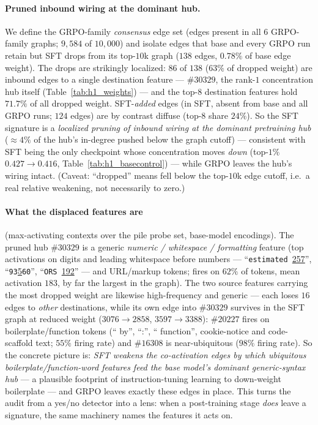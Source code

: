 \documentclass{article}
\begin{document}
\paragraph{Pruned inbound wiring at the dominant hub.} We define the GRPO-family \emph{consensus} edge set (edges present in all $6$ GRPO-family graphs; $9{,}584$ of $10{,}000$) and isolate edges that base and every GRPO run retain but SFT drops from its top-$10$k graph ($138$ edges, $0.78\%$ of base edge weight). The drops are strikingly localized: $86$ of $138$ ($63\%$ of dropped weight) are inbound edges to a single destination feature --- $\#30329$, the rank-$1$ concentration hub itself (Table~\ref{tab:h1_weights}) --- and the top-$8$ destination features hold $71.7\%$ of all dropped weight. SFT-\emph{added} edges (in SFT, absent from base and all GRPO runs; $124$ edges) are by contrast diffuse (top-$8$ share $24\%$). So the SFT signature is a \emph{localized pruning of inbound wiring at the dominant pretraining hub} ($\approx4\%$ of the hub's in-degree pushed below the graph cutoff) --- consistent with SFT being the only checkpoint whose concentration moves \emph{down} (top-$1\%$ $0.427\to0.416$, Table~\ref{tab:h1_basecontrol}) --- while GRPO leaves the hub's wiring intact. (Caveat: ``dropped'' means fell below the top-$10$k edge cutoff, i.e.\ a real relative weakening, not necessarily to zero.)

\paragraph{What the displaced features are} (max-activating contexts over the pile probe set, base-model encodings). The pruned hub $\#30329$ is a generic \emph{numeric / whitespace / formatting} feature (top activations on digits and leading whitespace before numbers --- ``\texttt{estimated~}\underline{257}'', ``\texttt{93}\underline{5}\texttt{60}'', ``\texttt{ORS~}\underline{192}'' --- and URL/markup tokens; fires on $62\%$ of tokens, mean activation $183$, by far the largest in the graph). The two source features carrying the most dropped weight are likewise high-frequency and generic --- each loses $16$ edges to \emph{other} destinations, while its own edge into $\#30329$ survives in the SFT graph at reduced weight ($3076\to2858$, $3597\to3388$): $\#20227$ fires on boilerplate/function tokens (`` by'', ``:'', `` function'', cookie-notice and code-scaffold text; $55\%$ firing rate) and $\#16308$ is near-ubiquitous ($98\%$ firing rate). So the concrete picture is: \emph{SFT weakens the co-activation edges by which ubiquitous boilerplate/function-word features feed the base model's dominant generic-syntax hub} --- a plausible footprint of instruction-tuning learning to down-weight boilerplate --- and GRPO leaves exactly these edges in place. This turns the audit from a yes/no detector into a lens: when a post-training stage \emph{does} leave a signature, the same machinery names the features it acts on.
\end{document}
